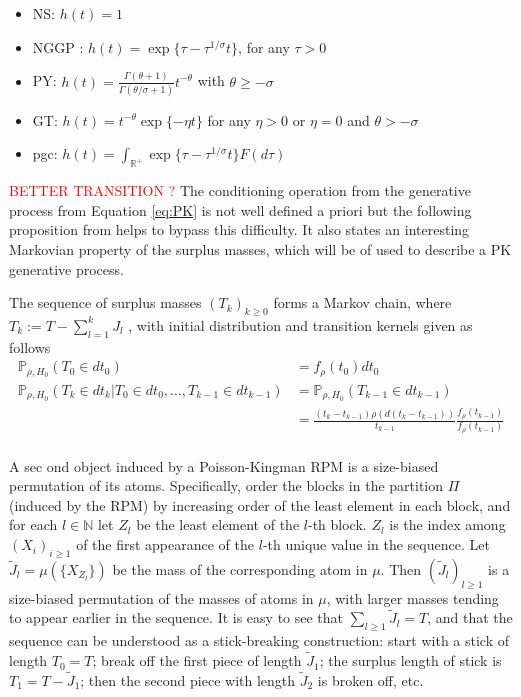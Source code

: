 \begin{itemize}
\item \acrfull{NS}: $h(t) = 1$
\item \acrfull{NGGP} : $h(t) = \exp\{\tau - \tau^{1/\sigma}t \}$, for any $\tau > 0$
\item \acrfull{PY}: $h(t) = \frac{\Gamma(\theta + 1)}{\Gamma(\theta / \sigma + 1)}t^{-\theta}$ with $\theta \ge -\sigma$
\item \acrfull{GT}: $h(t) = t^{-\theta} \exp\{-\eta t\}$ for any $\eta > 0$ or $\eta=0$ and $\theta>-\sigma$
\item \acrfull{pgc}: $h(t) = \int_{\mathbb{R}^+} \exp\{\tau - \tau^{1/\sigma}t \} F(d\tau)$ \\
\end{itemize}

\textcolor{red}{BETTER TRANSITION ?}
The conditioning operation from the generative process from Equation \ref{eq:PK} is not well defined a priori but the following proposition from \cite{Perman:1992ke} helps to bypass this difficulty. It also states an interesting Markovian property of the surplus masses, which will be of used to describe a \gls{PK} generative process. \\

\begin{proposition} \label{prop:perman}
The sequence of surplus masses $\left(T_k \right)_{k \ge 0}$ forms a Markov chain, where $T_k := T - \sum_{l=1}^k J_l$ , with initial distribution and transition kernels given as follows
\begin{equation*}
\begin{aligned}
\mathbb{P}_{\rho,H_0}(T_0 \in dt_0) &= f_\rho(t_0)dt_0 \\
\mathbb{P}_{\rho,H_0}(T_k \in dt_k|T_0 \in dt_0,\dots, T_{k-1} \in dt_{k-1}) &=  \mathbb{P}_{\rho,H_0}(T_{k-1} \in dt_{k-1})\\
&= \frac{(t_k-t_{k-1})\rho(d(t_k-t_{k-1}))}{t_{k-1}} \frac{f_\rho(t_{k-1})}{f_\rho(t_{k-1})} \\
\end{aligned}
\end{equation*}
\end{proposition}


A sec
ond object induced by a Poisson-Kingman \gls{RPM} is a size-biased permutation of its atoms. Specifically, order the blocks in the partition $\Pi$ (induced by the \gls{RPM}) by increasing order of the least element in each block, and for each $l \in \mathbb{N}$ let $Z_l$ be the least element of the $l$-th block. $Z_l$ is the index among $(X_i)_{i \ge 1}$ of the first appearance of the $l$-th unique value in the sequence.
Let $\tilde{J}_l = \mu(\{X_{Z_l}\})$ be the mass of the corresponding atom in $\mu$. Then $(\tilde{J}_l)_{l\ge 1}$ is a size-biased permutation of the masses of atoms in $\mu$, with larger masses tending to appear earlier in the sequence. It is easy to see that $\sum_{l \ge 1}{\tilde{J}_l} = T$, and that the sequence can be understood as a stick-breaking construction: start with a stick of length $T_0 = T$; break off the first piece of length $\tilde{J}_1$; the surplus length of stick is $T_1 = T - \tilde{J}_1$; then
the second piece with length $\tilde{J}_2$ is broken off, etc.

